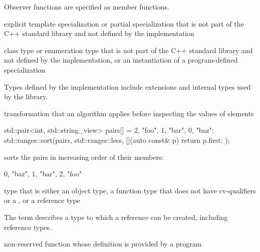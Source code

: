 \begin{defnote}
Observer functions are specified as
member functions.
\end{defnote}

%
explicit template specialization or partial specialization
that is not part of the C++ standard library and
not defined by the implementation

%
class type or enumeration type
that is not part of the C++ standard library and
not defined by the implementation,
or an instantiation of a program-defined specialization

\begin{defnote}
Types defined by the implementation include
extensions and internal types used by the library.
\end{defnote}

%
 transformation that
an algorithm applies before inspecting the values of elements

\begin{example}
\begin{codeblock}
std::pair<int, std::string_view> pairs[] = {{2, "foo"}, {1, "bar"}, {0, "baz"}};
std::ranges::sort(pairs, std::ranges::less{}, [](auto const& p) { return p.first; });
\end{codeblock}
sorts the pairs in increasing order of their  members:
\begin{codeblock}
{{0, "baz"}, {1, "bar"}, {2, "foo"}}
\end{codeblock}
\end{example}

%
type that is either an
object type, a function type that does not have cv-qualifiers or a
, or a reference type

\begin{defnote}
The term describes a type to which a reference can be created,
including reference types.
\end{defnote}

%
non-reserved function
whose definition is provided by a \Cpp{} program

